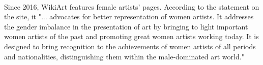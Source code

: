 \documentclass[../main]{subfiles}
\begin{document}
\paragraph{}
Since 2016, WikiArt features female artists' pages. According to the statement on the site, it "... advocates for better representation of women artists. It addresses the gender imbalance in the presentation of art by bringing to light important women artists of the past and promoting great women artists working today. It is designed to bring recognition to the achievements of women artists of all periods and nationalities, distinguishing them within the male-dominated art world."
\end{document}
